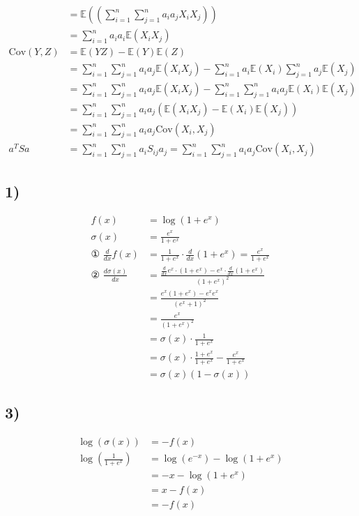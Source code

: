\documentclass{article}
\begin{document}
\begin{align*}
&= \mathbb{E} \left( \left( \sum_{i=1}^{n} \sum_{j=1}^{n} a_i a_j X_i X_j \right) \right) \\
&= \sum_{i=1}^{n} a_i a_i \mathbb{E}(X_i X_j) \\
\text{Cov}(Y, Z) &= \mathbb{E}(YZ) - \mathbb{E}(Y) \mathbb{E}(Z) \\
&= \sum_{i=1}^{n} \sum_{j=1}^{n} a_i a_j \mathbb{E}(X_i X_j) - \sum_{i=1}^{n} a_i \mathbb{E}(X_i) \sum_{j=1}^{n} a_j \mathbb{E}(X_j) \\
&= \sum_{i=1}^{n} \sum_{j=1}^{n} a_i a_j \mathbb{E}(X_i X_j) - \sum_{i=1}^{n} \sum_{j=1}^{n} a_i a_j \mathbb{E}(X_i) \mathbb{E}(X_j) \\
&= \sum_{i=1}^{n} \sum_{j=1}^{n} a_i a_j \left( \mathbb{E}(X_i X_j) - \mathbb{E}(X_i) \mathbb{E}(X_j) \right) \\
&= \sum_{i=1}^{n} \sum_{j=1}^{n} a_i a_j \text{Cov}(X_i, X_j) \\
a^T S a &= \sum_{i=1}^{n} \sum_{j=1}^{n} a_i S_{ij} a_j = \sum_{i=1}^{n} \sum_{j=1}^{n} a_i a_j \text{Cov}(X_i, X_j)
\end{align*}

\subsection*{1)}
\begin{align*}
f(x) &= \log(1 + e^x) \\
\sigma(x) &= \frac{e^x}{1 + e^x} \\
\text{① } \frac{d}{dx} f(x) &= \frac{1}{1 + e^x} \cdot \frac{d}{dx}(1 + e^x) = \frac{e^x}{1 + e^x} \\
\text{② } \frac{d \sigma(x)}{dx} &= \frac{\frac{d}{dx} e^x \cdot (1 + e^x) - e^x \cdot \frac{d}{dx}(1 + e^x)}{(1 + e^x)^2} \\
&= \frac{e^x (1 + e^x) - e^x e^x}{(e^x + 1)^2} \\
&= \frac{e^x}{(1 + e^x)^2} \\
&= \sigma(x) \cdot \frac{1}{1 + e^x} \\
&= \sigma(x) \cdot \frac{1 + e^x}{1 + e^x} - \frac{e^x}{1 + e^x} \\
&= \sigma(x) (1 - \sigma(x))
\end{align*}

\subsection*{3)}
\begin{align*}
\log(\sigma(x)) &= -f(x) \\
\log\left(\frac{1}{1+e^x}\right) &= \log\left(e^{-x}\right) - \log(1+e^x) \\
&= -x - \log(1+e^x) \\
&= x - f(x) \\
&= -f(x)
\end{align*}
\end{document}
